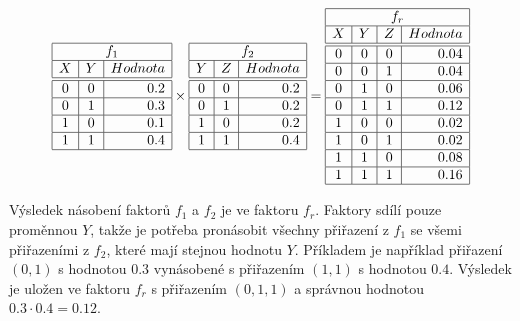 \begin{table}
\begin{equation*}
\begin{array}{|c|c|r|}
    \hline
    \multicolumn{3}{|c|}{f_1} \\
    \hline
    X & Y & Hodnota \\
    \hline
    \hline
    0 & 0 & 0.2 \\
    \hline
    0 & 1 & 0.3 \\
    \hline
    1 & 0 & 0.1 \\
    \hline
    1 & 1 & 0.4 \\
    \hline
\end{array}
\times
\begin{array}{|c|c|r|}
    \hline
    \multicolumn{3}{|c|}{f_2} \\
    \hline
    Y & Z & Hodnota \\
    \hline
    \hline
    0 & 0 & 0.2 \\
    \hline
    0 & 1 & 0.2 \\
    \hline
    1 & 0 & 0.2 \\
    \hline
    1 & 1 & 0.4 \\
    \hline
\end{array}
=
\begin{array}{|c|c|c|r|}
    \hline
    \multicolumn{4}{|c|}{f_r} \\
    \hline
    X & Y & Z & Hodnota \\
    \hline
    \hline
    0 & 0 & 0 & 0.04 \\
    \hline
    0 & 0 & 1 & 0.04 \\
    \hline
    0 & 1 & 0 & 0.06 \\
    \hline
    0 & 1 & 1 & 0.12 \\
    \hline
    1 & 0 & 0 & 0.02 \\
    \hline
    1 & 0 & 1 & 0.02 \\
    \hline
    1 & 1 & 0 & 0.08 \\
    \hline
    1 & 1 & 1 & 0.16\\
    \hline
\end{array}
\end{equation*}
\caption{Příklad násobení dvou faktorů, které sdílí proměnnou.}
\label{tab:facmul}
\end{table}

Výsledek násobení faktorů $f_1$ a $f_2$ je ve faktoru $f_r$.
Faktory sdílí pouze proměnnou $Y$, takže je potřeba pronásobit všechny přiřazení z $f_1$ se všemi přiřazeními z $f_2$, které mají stejnou hodnotu $Y$.
Příkladem je například přiřazení $(0, 1)$ s hodnotou $0.3$ vynásobené s přiřazením $(1, 1)$ s hodnotou $0.4$.
Výsledek je uložen ve faktoru $f_r$ s přiřazením $(0, 1, 1)$ a správnou hodnotou $0.3 \cdot 0.4 = 0.12$.


